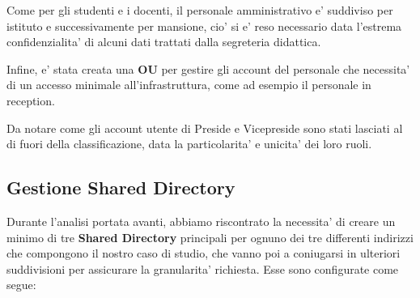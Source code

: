 \documentclass{report}
\begin{document}
            Come per gli studenti e i docenti, il personale amministrativo e' suddiviso per istituto e successivamente
             per mansione, cio' si e' reso necessario data l'estrema confidenzialita' di alcuni dati trattati dalla
             segreteria didattica.

            Infine, e' stata creata una \textbf{OU} per gestire gli account del personale che necessita' di un
             accesso minimale all'infrastruttura, come ad esempio il personale in reception.

            Da notare come gli account utente di Preside e Vicepreside sono stati lasciati al di fuori della
             classificazione, data la particolarita' e unicita' dei loro ruoli.
            \subsection{Gestione Shared Directory}
            Durante l'analisi portata avanti, abbiamo riscontrato la necessita' di creare un minimo di tre
             \textbf{Shared Directory} principali per ognuno dei tre differenti indirizzi che compongono il nostro
             caso di studio, che vanno poi a coniugarsi in ulteriori suddivisioni per assicurare la granularita'
             richiesta. Esse sono configurate come segue:
\end{document}
